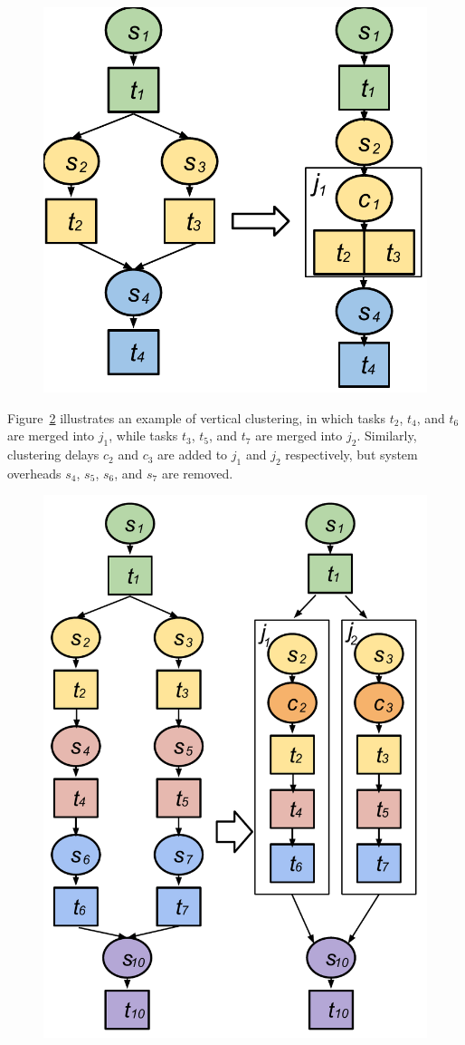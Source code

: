 \begin{figure}[!htb]
\centering
 \includegraphics[width=0.55\linewidth]{figures/model/hc_color.pdf}
  \label{fig:model_hc}
\end{figure}

Figure~\ref{fig:model_vc} illustrates an example of vertical clustering, in which tasks $t_2$, $t_4$, and $t_6$ are merged into $j_1$, while tasks $t_3$, $t_5$, and $t_7$ are merged into $j_2$. Similarly, clustering delays $c_2$ and $c_3$ are added to $j_1$ and $j_2$ respectively, but system overheads $s_4$, $s_5$, $s_6$, and $s_7$ are removed. 

\begin{figure}[!htb]
\centering
 \includegraphics[width=0.6\linewidth]{figures/model/vc_color.pdf}
  \label{fig:model_vc}
\end{figure}

